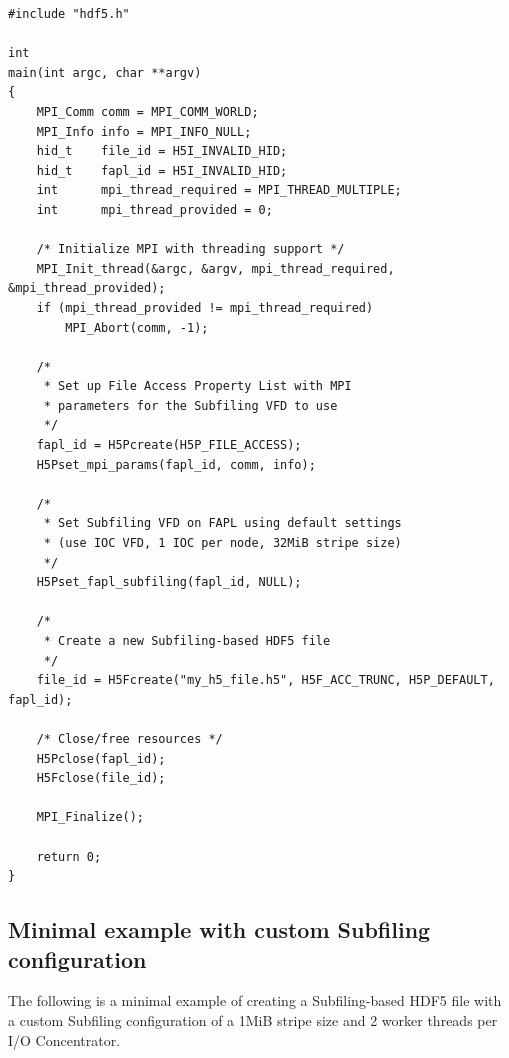 \documentclass[../main.tex]{subfiles}
\begin{document}
\label{ex:ex1}
\begin{verbatim}
#include "hdf5.h"

int
main(int argc, char **argv)
{
    MPI_Comm comm = MPI_COMM_WORLD;
    MPI_Info info = MPI_INFO_NULL;
    hid_t    file_id = H5I_INVALID_HID;
    hid_t    fapl_id = H5I_INVALID_HID;
    int      mpi_thread_required = MPI_THREAD_MULTIPLE;
    int      mpi_thread_provided = 0;

    /* Initialize MPI with threading support */
    MPI_Init_thread(&argc, &argv, mpi_thread_required, &mpi_thread_provided);
    if (mpi_thread_provided != mpi_thread_required)
        MPI_Abort(comm, -1);

    /*
     * Set up File Access Property List with MPI
     * parameters for the Subfiling VFD to use
     */
    fapl_id = H5Pcreate(H5P_FILE_ACCESS);
    H5Pset_mpi_params(fapl_id, comm, info);

    /*
     * Set Subfiling VFD on FAPL using default settings
     * (use IOC VFD, 1 IOC per node, 32MiB stripe size)
     */
    H5Pset_fapl_subfiling(fapl_id, NULL);
    
    /*
     * Create a new Subfiling-based HDF5 file
     */
    file_id = H5Fcreate("my_h5_file.h5", H5F_ACC_TRUNC, H5P_DEFAULT, fapl_id);

    /* Close/free resources */
    H5Pclose(fapl_id);
    H5Fclose(file_id);

    MPI_Finalize();

    return 0;
}
\end{verbatim}

\subsection{Minimal example with custom Subfiling configuration}

The following is a minimal example of creating a Subfiling-based HDF5 file
with a custom Subfiling configuration of a 1MiB stripe size and 2 worker
threads per I/O Concentrator.
\end{document}

